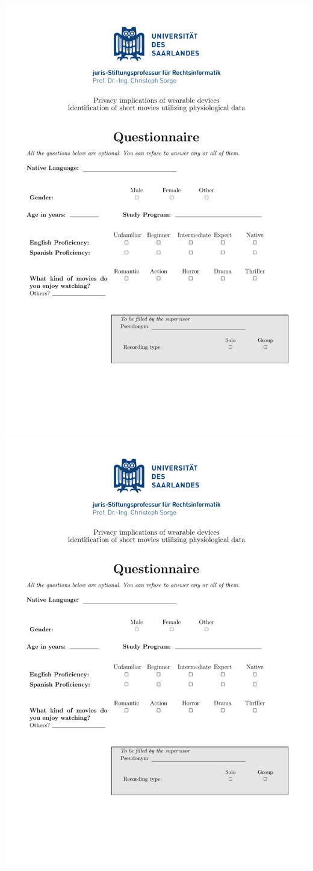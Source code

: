 \includegraphics[page=2,width=170mm]{pdf/questionner.pdf}
\newpage
\includegraphics[page=3,width=170mm]{pdf/questionner.pdf}
